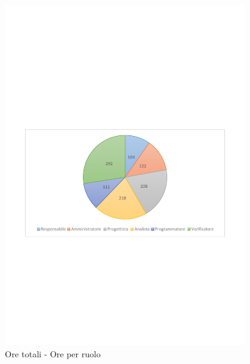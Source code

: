 \documentclass[../PianoProgetto.tex]{subfiles}
\begin{document}
	\begin{figure}[!h]
		\centering
		\includegraphics[width=0.93\textwidth , trim=2cm 9.5cm 2cm 11cm]{grafici/Riepilogo/Totali/ore-ruolo}
			\caption{Ore totali - Ore per ruolo}
		\label{fig:CircleChart-totale_ore_r}
	\end{figure}	
\vfill
\end{document}
